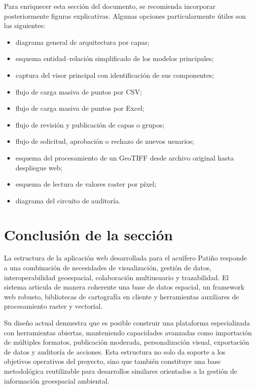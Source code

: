 \documentclass[12pt,a4paper]{report}
\begin{document}
Para enriquecer esta secci\'on del documento, se recomienda incorporar posteriormente figuras explicativas. Algunas opciones particularmente \'utiles son las siguientes:

\begin{itemize}
    \item diagrama general de arquitectura por capas;
    \item esquema entidad--relaci\'on simplificado de los modelos principales;
    \item captura del visor principal con identificaci\'on de sus componentes;
    \item flujo de carga masiva de puntos por CSV;
    \item flujo de carga masiva de puntos por Excel;
    \item flujo de revisi\'on y publicaci\'on de capas o grupos;
    \item flujo de solicitud, aprobaci\'on o rechazo de nuevos usuarios;
    \item esquema del procesamiento de un GeoTIFF desde archivo original hasta despliegue web;
    \item esquema de lectura de valores raster por p\'ixel;
    \item diagrama del circuito de auditor\'ia.
\end{itemize}


\section{Conclusi\'on de la secci\'on}

La estructura de la aplicaci\'on web desarrollada para el acu\'ifero Pati\~no responde a una combinaci\'on de necesidades de visualizaci\'on, gesti\'on de datos, interoperabilidad geoespacial, colaboraci\'on multiusuario y trazabilidad. El sistema articula de manera coherente una base de datos espacial, un framework web robusto, bibliotecas de cartograf\'ia en cliente y herramientas auxiliares de procesamiento raster y vectorial.

Su dise\~no actual demuestra que es posible construir una plataforma especializada con herramientas abiertas, manteniendo capacidades avanzadas como importaci\'on de m\'ultiples formatos, publicaci\'on moderada, personalizaci\'on visual, exportaci\'on de datos y auditor\'ia de acciones. Esta estructura no solo da soporte a los objetivos operativos del proyecto, sino que tambi\'en constituye una base metodol\'ogica reutilizable para desarrollos similares orientados a la gesti\'on de informaci\'on geoespacial ambiental.

\ifcapituloestructuraStandalone
  
\end{document}

